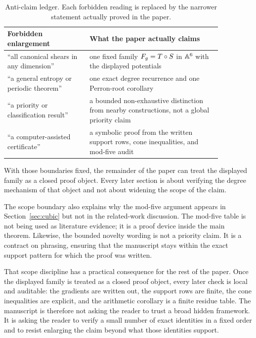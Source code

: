 \documentclass[11pt]{article}
\theoremstyle{remark}
\numberwithin{equation}{section}
\begin{document}
\begin{table}[t]
\centering
\small
\begin{tabular}{p{0.33\linewidth}p{0.53\linewidth}}
\toprule
Forbidden enlargement & What the paper actually claims \\
\midrule
``all canonical shears in any dimension'' & one fixed family \(F_g=T\circ S\) in \(\mathbb{A}^6\) with the displayed potentials \\
``a general entropy or periodic theorem'' & one exact degree recurrence and one Perron-root corollary \\
``a priority or classification result'' & a bounded non-exhaustive distinction from nearby constructions, not a global priority claim \\
``a computer-assisted certificate'' & a symbolic proof from the written support rows, cone inequalities, and mod-five audit \\
\bottomrule
\end{tabular}
\caption{Anti-claim ledger.  Each forbidden reading is replaced by the narrower statement actually proved in the paper.}
\label{tab:anticlaim}
\end{table}

With those boundaries fixed, the remainder of the paper can treat the displayed
family as a closed proof object.  Every later section is about verifying the
degree mechanism of that object and not about widening the scope of the claim.

The scope boundary also explains why the mod-five argument appears in
Section~\ref{sec:cubic} but not in the related-work discussion.  The mod-five
table is not being used as literature evidence; it is a proof device inside the
main theorem.  Likewise, the bounded novelty wording is not a priority claim.
It is a contract on phrasing, ensuring that the manuscript stays within the
exact support pattern for which the proof was written.

That scope discipline has a practical consequence for the rest of the paper.
Once the displayed family is treated as a closed proof object, every later
check is local and auditable: the gradients are written out, the support rows
are finite, the cone inequalities are explicit, and the arithmetic corollary is
a finite residue table.  The manuscript is therefore not asking the reader to
trust a broad hidden framework.  It is asking the reader to verify a small
number of exact identities in a fixed order and to resist enlarging the claim
beyond what those identities support.
\end{document}
